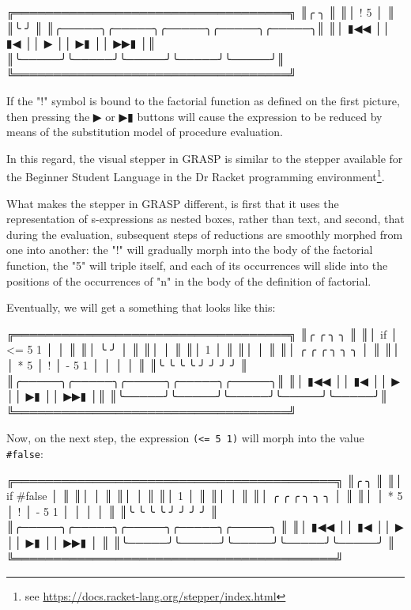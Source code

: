 \documentclass[acmsmall]{acmart}
\newenvironment{Snippet}{\Verbatim[samepage=true]}{\endVerbatim}
\begin{document}
\begin{Snippet}
╔═══════════════════════════════════╗
║╭     ╮                            ║
║│ ! 5 │                            ║
║╰     ╯                            ║
║╭─────╮╭─────╮╭─────╮╭─────╮╭─────╮║
║│ ▮◀◀ ││ ▮◀  ││  ▶  ││  ▶▮ ││ ▶▶▮ │║
║╰─────╯╰─────╯╰─────╯╰─────╯╰─────╯║
╚═══════════════════════════════════╝
\end{Snippet}

If the "!" symbol is bound to the factorial function as defined on the
first picture, then pressing the ▶ or ▶▮ buttons will cause the
expression to be reduced by means of the substitution model of
procedure evaluation\cite{SICP}.

In this regard, the visual stepper in GRASP is similar to the stepper
available for the Beginner Student Language in the Dr Racket
programming environment\footnote{see
\url{https://docs.racket-lang.org/stepper/index.html}}.

What makes the stepper in GRASP different, is first that it uses the
representation of s-expressions as nested boxes, rather than text, and
second, that during the evaluation, subsequent steps of reductions are
smoothly morphed from one into another: the "!" will gradually morph
into the body of the factorial function, the "5" will triple itself,
and each of its occurrences will slide into the positions of the
occurrences of "n" in the body of the definition of factorial.

Eventually, we will get a something that looks like this:

\begin{Snippet}
╔═══════════════════════════════════╗
║╭    ╭        ╮                 ╮  ║
║│ if │ <= 5 1 │                 │  ║
║│    ╰        ╯                 │  ║
║│                               │  ║
║│       1                       │  ║
║│                               │  ║
║│       ╭     ╭   ╭       ╮ ╮ ╮ │  ║
║│       │ * 5 │ ! │ - 5 1 │ │ │ │  ║
║╰       ╰     ╰   ╰       ╯ ╯ ╯ ╯  ║
║╭─────╮╭─────╮╭─────╮╭─────╮╭─────╮║
║│ ▮◀◀ ││ ▮◀  ││  ▶  ││  ▶▮ ││ ▶▶▮ │║
║╰─────╯╰─────╯╰─────╯╰─────╯╰─────╯║
╚═══════════════════════════════════╝
\end{Snippet}

Now, on the next step, the expression \texttt{(<= 5 1)} will morph into the
value \texttt{\#false}:

\begin{Snippet}
╔═════════════════════════════════════════╗
║╭                               ╮        ║
║│ if #false                     │        ║
║│                               │        ║
║│                               │        ║
║│       1                       │        ║
║│                               │        ║
║│       ╭     ╭   ╭       ╮ ╮ ╮ │        ║
║│       │ * 5 │ ! │ - 5 1 │ │ │ │        ║
║╰       ╰     ╰   ╰       ╯ ╯ ╯ ╯        ║
║╭─────╮╭─────╮╭─────╮╭─────╮╭─────╮      ║
║│ ▮◀◀ ││ ▮◀  ││  ▶  ││  ▶▮ ││ ▶▶▮ │      ║
║╰─────╯╰─────╯╰─────╯╰─────╯╰─────╯      ║
╚═════════════════════════════════════════╝
\end{Snippet}
\end{document}
